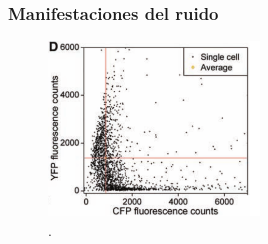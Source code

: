 \documentclass[10pt]{beamer}
\begin{document}
\begin{frame}
\frametitle{Manifestaciones del ruido}
\begin{figure}[p]
    \centering
    \includegraphics[width=0.5\textwidth]{noiseGFP.png}\\
    \tiny \cite{pedraza05}.
\end{figure}
\end{frame}
\end{document}
